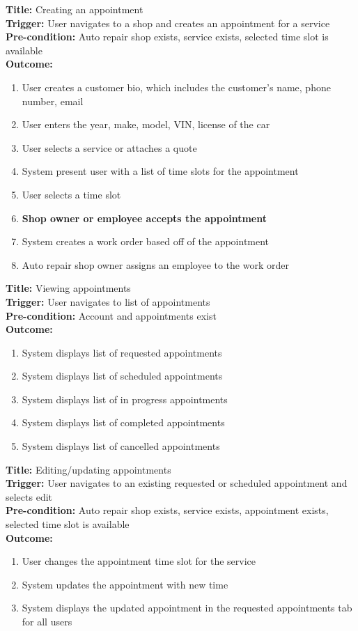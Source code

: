 \documentclass[12pt]{article}
\begin{document}
\textbf{Title:} Creating an appointment\\
\textbf{Trigger:} User navigates to a shop and creates an appointment for a service\\
\textbf{Pre-condition:} Auto repair shop exists, service exists, selected time slot is available\\
\textbf{Outcome:}
\begin{enumerate}
	\item User creates a customer bio, which includes the customer's name, phone number, email
	\item User enters the year, make, model, VIN, license of the car
	\item User selects a service or attaches a quote
	\item System present user with a list of time slots for the appointment
	\item User selects a time slot
	\item \textbf{Shop owner or employee accepts the appointment}
	\item System creates a work order based off of the appointment
	\item Auto repair shop owner assigns an employee to the work order
\end{enumerate}

\textbf{Title:} Viewing appointments\\
\textbf{Trigger:} User navigates to list of appointments\\
\textbf{Pre-condition:} Account and appointments exist\\
\textbf{Outcome:}
\begin{enumerate}
	\item System displays list of requested appointments
	\item System displays list of scheduled appointments
	\item System displays list of in progress appointments
	\item System displays list of completed appointments
	\item System displays list of cancelled appointments

\end{enumerate}

\textbf{Title:} Editing/updating appointments\\
\textbf{Trigger:} User navigates to an existing requested or scheduled appointment and selects edit\\
\textbf{Pre-condition:} Auto repair shop exists, service exists, appointment exists, selected time slot is available\\
\textbf{Outcome:}
\begin{enumerate}
	\item User changes the appointment time slot for the service
	\item System updates the appointment with new time
	\item System displays the updated appointment in the requested appointments tab for all users
\end{enumerate}
\end{document}
